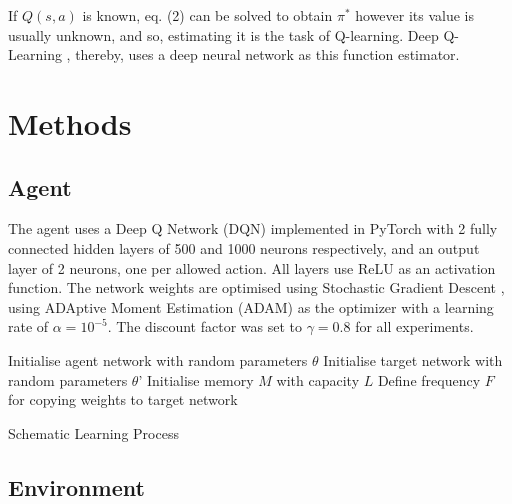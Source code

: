 \documentclass[conference]{IEEEtran}
\begin{document}
If $Q(s,a)$ is known, eq. (2) can be solved to obtain $\pi^*$ however its value is usually unknown, and so, estimating it is the task of Q-learning. Deep Q-Learning \cite{mnih2015}, thereby, uses a deep neural network as this function estimator.

\section{Methods} \label{methods}
\subsection{Agent}
The agent uses a Deep Q Network (DQN) implemented in PyTorch \cite{pytorch} with 2 fully connected hidden layers of 500 and 1000 neurons respectively, and an output layer of 2 neurons, one per allowed action.
All layers use ReLU as an activation function. The network weights are optimised using Stochastic Gradient Descent \cite{kiefer}, using ADAptive Moment Estimation (ADAM) \cite{adam} as the optimizer with a learning rate of $\alpha=10^{-5}$. The discount factor was set to $\gamma=0.8$ for all experiments.

\begin{algorithm}
\SetAlgoLined
 Initialise agent network with random parameters $\theta$\;
 Initialise target network with random parameters $\theta$'\;
 Initialise memory $M$ with capacity $L$\;
 Define frequency $F$ for copying weights to target network\;
 \caption{Schematic Learning Process}
\end{algorithm}
\subsection{Environment}
\end{document}
